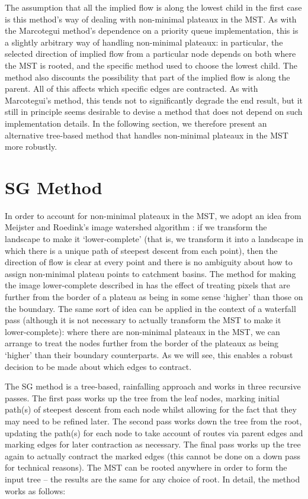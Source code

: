\documentclass[preprint,a4paper]{elsarticle}
\begin{document}
The assumption that all the implied flow is along the lowest child in the first case is this method's way of dealing with non-minimal plateaux in the MST. As with the Marcotegui method's dependence on a priority queue implementation, this is a slightly arbitrary way of handling non-minimal plateaux: in particular, the selected direction of implied flow from a particular node depends on both where the MST is rooted, and the specific method used to choose the lowest child. The method also discounts the possibility that part of the implied flow is along the parent. All of this affects which specific edges are contracted. As with Marcotegui's method, this tends not to significantly degrade the end result, but it still in principle seems desirable to devise a method that does not depend on such implementation details. In the following section, we therefore present an alternative tree-based method that handles non-minimal plateaux in the MST more robustly.

\section{SG Method}
\label{sec:golodetz}

In order to account for non-minimal plateaux in the MST, we adopt an idea from Meijster and Roedink's image watershed algorithm \cite{meijster98}: if we transform the landscape to make it `lower-complete' (that is, we transform it into a landscape in which there is a unique path of steepest descent from each point), then the direction of flow is clear at every point and there is no ambiguity about how to assign non-minimal plateau points to catchment basins. The method for making the image lower-complete described in \cite{meijster98} has the effect of treating pixels that are further from the border of a plateau as being in some sense `higher' than those on the boundary. The same sort of idea can be applied in the context of a waterfall pass (although it is not necessary to actually transform the MST to make it lower-complete): where there are non-minimal plateaux in the MST, we can arrange to treat the nodes further from the border of the plateaux as being `higher' than their boundary counterparts. As we will see, this enables a robust decision to be made about which edges to contract.

The SG method is a tree-based, rainfalling approach and works in three recursive passes. The first pass works up the tree from the leaf nodes, marking initial path(s) of steepest descent from each node whilst allowing for the fact that they may need to be refined later. The second pass works down the tree from the root, updating the path(s) for each node to take account of routes via parent edges and marking edges for later contraction as necessary. The final pass works up the tree again to actually contract the marked edges (this cannot be done on a down pass for technical reasons). The MST can be rooted anywhere in order to form the input tree -- the results are the same for any choice of root. In detail, the method works as follows:
\end{document}
